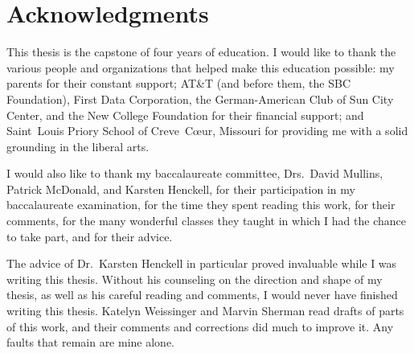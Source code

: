 
\bigskip

\begingroup
\let\clearpage\relax
\let\cleardoublepage\relax
\let\cleardoublepage\relax
\chapter*{Acknowledgments}
This thesis is the capstone of four years of education. I would like to thank the various people and organizations that helped make this education possible: my parents for their constant support; AT\&T (and before them, the SBC Foundation), First Data Corporation, the German-American Club of Sun City Center, and the New College Foundation for their financial support; and Saint~Louis Priory School of Creve~C\oe ur, Missouri for providing me with a solid grounding in the liberal arts.

I would also like to thank my baccalaureate committee, Drs.~David Mullins, Patrick McDonald, and Karsten Henckell, for their participation in my baccalaureate examination, for the time they spent reading this work, for their comments, for the many wonderful classes they taught in which I had the chance to take part, and for their advice.

The advice of Dr.~Karsten Henckell in particular proved invaluable while I was writing this thesis. Without his counseling on the direction and shape of my thesis, as well as his careful reading and comments, I would never have finished writing this thesis. Katelyn Weissinger and Marvin Sherman read drafts of parts of this work, and their comments and corrections did much to improve it. Any faults that remain are mine alone.
\endgroup



